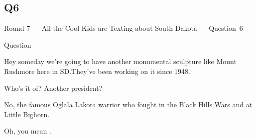 \documentclass[11pt]{beamer}
\begin{document}
\subsection*{Q6}
\begin{frame}[t]{Round 7 --- All the Cool Kids are Texting about South Dakota --- \mbox{Question 6}}
\begin{block}{Question}

\begin{minipage}{0.9\textwidth}
\begin{mdframed}[
    roundcorner=7pt,
    backgroundcolor=black!5,
    linecolor=black!5,
    fontcolor=black,
    ignorelastdescenders]
\begin{flushleft}
{\small{}\selectfont{}
Hey someday we're going to have another monumental sculpture like Mount Rushmore here in SD.\@ They've been working on it since 1948.
}
\end{flushleft}
\end{mdframed}
\end{minipage}

\hfill{}\begin{minipage}{0.9\textwidth}
\begin{mdframed}[
    roundcorner=7pt,
    backgroundcolor=blue!80!white,
    linecolor=blue!80!white,
    fontcolor=white,
    ignorelastdescenders]
\begin{flushleft}
{\small{}\selectfont{}
Who's it of? Another president?
}
\end{flushleft}
\end{mdframed}
\end{minipage}

\begin{minipage}{0.9\textwidth}
\begin{mdframed}[
    roundcorner=7pt,
    backgroundcolor=black!5,
    linecolor=black!5,
    fontcolor=black,
    ignorelastdescenders]
\begin{flushleft}
{\small{}\selectfont{}
No, the famous Oglala Lakota warrior who fought in the Black Hills Wars and at Little Bighorn.
}
\end{flushleft}
\end{mdframed}
\end{minipage}

\hfill{}\begin{minipage}{0.9\textwidth}
\begin{mdframed}[
    roundcorner=7pt,
    backgroundcolor=blue!80!white,
    linecolor=blue!80!white,
    fontcolor=white,
    ignorelastdescenders]
\begin{flushleft}
{\small{}\selectfont{}
Oh, you mean \textunderscore{}\textunderscore{}\textunderscore{}\textunderscore{}\textunderscore{}\textunderscore{} \textunderscore{}\textunderscore{}\textunderscore{}\textunderscore{}\textunderscore{}\textunderscore{}.
}
\end{flushleft}
\end{mdframed}
\end{minipage}
\end{block}
\end{frame}
\end{document}
